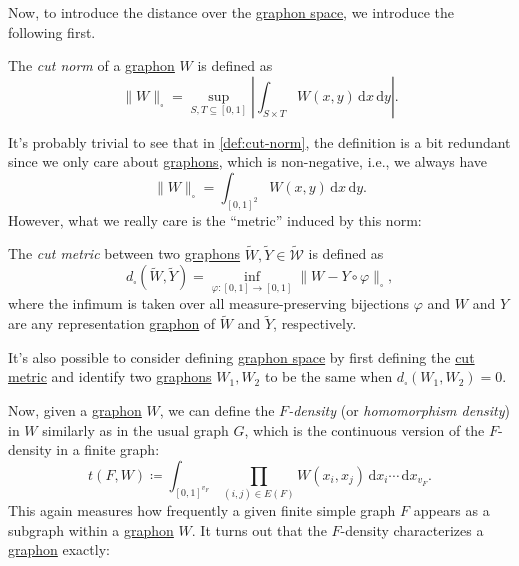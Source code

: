 Now, to introduce the distance over the \hyperref[def:graphon-space]{graphon space}, we introduce the following first.

\begin{definition}\label{def:cut-norm}
	The \emph{cut norm} of a \hyperref[def:graphon]{graphon} \(W\) is defined as
	\[
		\lVert W \rVert _{\square }
		= \sup _{S, T \subseteq [0, 1]} \left\lvert \int _{S \times T} W(x, y) \,\mathrm{d} x \,\mathrm{d} y \right\rvert .
	\]
\end{definition}

It's probably trivial to see that in \autoref{def:cut-norm}, the definition is a bit redundant since we only care about \hyperref[def:graphon]{graphons}, which is non-negative, i.e., we always have
\[
	\lVert W \rVert _{\square }
	= \int_{[0, 1]^2} W(x, y) \,\mathrm{d}x \,\mathrm{d} y.
\]
However, what we really care is the ``metric'' induced by this norm:

\begin{definition}\label{def:cut-metric}
	The \emph{cut metric} between two \hyperref[def:graphon]{graphons} \(\widetilde{W} , \widetilde{Y} \in \widetilde{\mathcal{W} } \) is defined as
	\[
		d_{\square}(\widetilde{W} , \widetilde{Y} ) = \inf _{\varphi \colon [0, 1] \to [0, 1]} \lVert W - Y \circ \varphi \rVert _{\square},
	\]
	where the infimum is taken over all measure-preserving bijections \(\varphi \) and \(W\) and \(Y\) are any representation \hyperref[def:graphon]{graphon} of \(\widetilde{W} \) and \(\widetilde{Y} \), respectively.
\end{definition}

\begin{remark}
	It's also possible to consider defining \hyperref[def:graphon-space]{graphon space} by first defining the \hyperref[def:cut-metric]{cut metric} and identify two \hyperref[def:graphon]{graphons} \(W_1, W_2\) to be the same when \(d_{\square }(W_1 , W_2) = 0\).
\end{remark}

Now, given a \hyperref[def:graphon]{graphon} \(W\), we can define the \emph{\(F\)-density} (or \emph{homomorphism density}) in \(W\) similarly as in the usual graph \(G\), which is the continuous version of the \(F\)-density in a finite graph:
\[
	t(F, W)
	\coloneqq \int_{[0, 1]^{v_F}} \prod_{(i, j) \in E(F)} W(x_i, x_j) \,\mathrm{d} x_i \cdots \,\mathrm{d} x_{v_F}.
\]
This again measures how frequently a given finite simple graph \(F\) appears as a subgraph within a \hyperref[def:graphon]{graphon} \(W\). It turns out that the \(F\)-density characterizes a \hyperref[def:graphon]{graphon} exactly:

